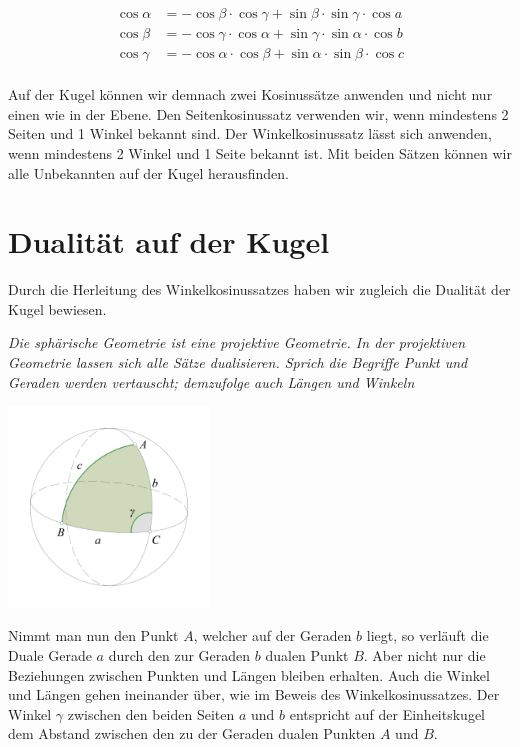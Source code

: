 \begin{refsection}
\begin{align*}
{\cos \alpha} &= {-\cos \beta} \cdot {\cos \gamma} + {\sin \beta} \cdot {\sin \gamma} \cdot {\cos a}\\
{\cos \beta} &= {-\cos \gamma} \cdot {\cos \alpha} + {\sin \gamma} \cdot {\sin \alpha} \cdot {\cos b}\\
{\cos \gamma} &= {-\cos \alpha} \cdot {\cos \beta} + {\sin \alpha} \cdot {\sin \beta} \cdot {\cos c}\\
\end{align*}

Auf der Kugel können wir demnach zwei Kosinussätze anwenden und nicht nur einen wie in der Ebene. Den Seitenkosinussatz verwenden wir, wenn mindestens 2 Seiten und 1 Winkel bekannt sind. Der Winkelkosinussatz lässt sich anwenden, wenn mindestens 2 Winkel und 1 Seite bekannt ist. Mit beiden Sätzen können wir alle Unbekannten auf der Kugel herausfinden.



\section{Dualität auf der Kugel}

Durch die Herleitung des Winkelkosinussatzes haben wir zugleich die Dualität der Kugel bewiesen.

\begin{satz}\textit{Die sphärische Geometrie ist eine projektive Geometrie. In der projektiven Geometrie lassen sich alle Sätze dualisieren. Sprich die Begriffe Punkt und Geraden werden vertauscht; demzufolge auch Längen und Winkeln}
\label{skript:kugel:satz:Dualitaet}
\end{satz}

\begin{center}
        \includegraphics[width=0.4\textwidth]{kugel/Dualitaet.jpg}
\end{center}

Nimmt man nun den Punkt $A$, welcher auf der Geraden $b$ liegt, so verläuft die Duale Gerade $a$ durch den zur Geraden $b$ dualen Punkt $B$. 
Aber nicht nur die Beziehungen zwischen Punkten und Längen bleiben erhalten. Auch die Winkel und Längen gehen ineinander über, wie im Beweis des Winkelkosinussatzes.
Der Winkel $\gamma$ zwischen den beiden Seiten $a$ und $b$ entspricht auf der Einheitskugel dem Abstand zwischen den zu der Geraden dualen Punkten $A$ und $B$.




\end{refsection}

